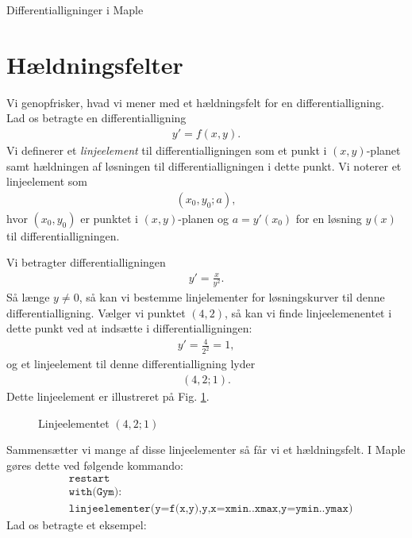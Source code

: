 \begin{center}
	\Huge
	Differentialligninger i Maple
\end{center}

\section*{Hældningsfelter}

Vi genopfrisker, hvad vi mener med et hældningsfelt for en differentialligning. Lad os betragte en differentialligning
\begin{align*}
	y' = f(x,y). 
\end{align*}
Vi definerer et \textit{linjeelement} til differentialligningen som et punkt i $(x,y)$-planet samt hældningen af løsningen til differentialligningen i dette punkt. Vi noterer et linjeelement som
\begin{align*}
	(x_0,y_0;a),
\end{align*}
hvor $(x_0,y_0)$ er punktet i $(x,y)$-planen og $a = y'(x_0)$ for en løsning $y(x)$ til differentialligningen. 
\begin{exa}
	Vi betragter differentialligningen 
	\begin{align*}
		y' = \frac{x}{y^2}.
	\end{align*}
	Så længe $y\neq 0$, så kan vi bestemme linjelementer for løsningskurver til denne differentialligning. Vælger vi punktet $(4,2)$, så kan vi finde linjeelemenentet i dette punkt ved at indsætte i 
	differentialligningen:
	\begin{align*}
		y' = \frac{4}{2^2} = 1,
	\end{align*}
	og et linjeelement til denne differentialligning lyder
	\begin{align*}
		(4,2;1).
	\end{align*}
	Dette linjeelement er illustreret på Fig. \ref{fig:linjeelement}.
	\begin{figure}[H]
		\center
		\caption{Linjeelementet $(4,2;1)$}
		\label{fig:linjeelement}
	\end{figure}
\end{exa}
Sammensætter vi mange af disse linjeelementer så får vi et hældningsfelt. I Maple gøres dette ved følgende kommando:
\begin{align*}
	&\texttt{restart}\\
	&\texttt{with(Gym):}\\
	&\texttt{linjeelementer(y=f(x,y),y,x=xmin..xmax,y=ymin..ymax)}	
\end{align*}
Lad os betragte et eksempel:


